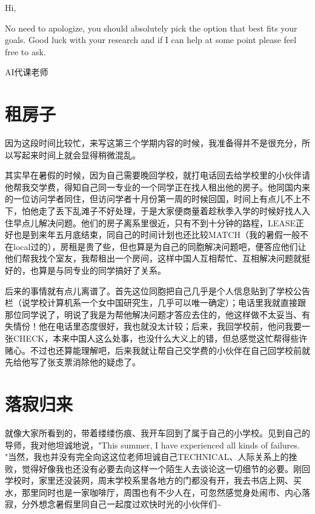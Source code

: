 \documentclass[12pt]{book}
\begin{document}
Hi,

No need to apologize, you should absolutely pick the option that best fits your goals.  Good luck with your research and if I can help at some point please feel free to ask.

AI代课老师

\chapter{租房子}
\label{sec-9}

因为这段时间比较忙，来写这第三个学期内容的时候，我准备得并不是很充分，所以写起来时间上就会显得稍微混乱。

其实早在暑假的时候，因为自己需要晚回学校，就打电话回去给学校里的小伙伴请他帮我交学费，得知自己同一专业的一个同学正在找人租出他的房子。他同国内来的一位访问学者同住，但访问学者十月份第一周的时候回国，时间上有点儿不上不下，怕他走了丢下乱滩子不好处理，于是大家便商量着趁秋季入学的时候好找人入住早点儿解决问题。他们的房子离系里很近，只有不到十分钟的路程，LEASE正好也是到来年五月底结束，同自己的时间计划也还比较MATCH（我的暑假一般不在local过的），房租是贵了些，但也算是为自己的同胞解决问题吧，便答应他们让他们帮我找个室友，我帮租出一个房间，这样中国人互相帮忙、互相解决问题就挺好的，也算是与同专业的同学搞好了关系。

后来的事情就有点儿离谱了。首先这位同胞把自己几乎是个人信息贴到了学校公告栏（说学校计算机系一个女中国研究生，几乎可以唯一确定）；电话里我就直接跟那位同学说了，明说了我是为帮他解决问题才答应去住的，他这样做不太妥当、有失情份！他在电话里态度很好，我也就没太计较；后来，我回学校前，他问我要一张CHECK，本来中国人这么处事，也没什么大义上的错，但总感觉这忙帮得些许赌心。不过也还算能理解吧，后来我就让帮自己交学费的小伙伴在自己回学校前就先给他写了张支票消除他的疑虑了。

\chapter{落寂归来}
\label{sec-10}

就像大家所看到的，带着缕缕伤痕、我开车回到了属于自己的小学校。见到自己的导师，我对他坦诚地说，"This summer, I have experienced all kinds of failures. "当然，我也并没有完全向这这位老师坦诚自己TECHNICAL、人际关系上的挫败，觉得好像我也还没有必要去向这样一个陌生人去谈论这一切细节的必要。刚回学校时，家里还没装网，周末学校系里各地方的门都没有开，我去书店上网、买水，那里同时也是一家咖啡厅，周围也有不少人在，可忽然感觉身处闹市、内心落寂，分外想念暑假里同自己一起度过欢快时光的小伙伴们\textasciitilde{}~
\end{document}
